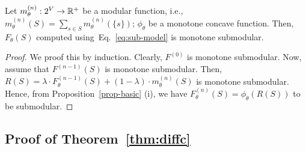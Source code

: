 \documentclass{article}
\begin{document}
\begin{proposition} 
Let  $m^{(n)} _{\theta} : 2^V \to \mathbb{R}^+ $ be a modular function, i.e.,  $m^{(n)}  _{\theta} (S) = \sum_{s\in S}m^{(n)} _{\theta}(\{s\})$;   $\phi_{\theta}$ be a monotone concave function. Then, $F_{\theta}(S)$ computed using~Eq.~\eqref{eq:sub-model} is  monotone submodular.
\end{proposition}

\begin{proof}
 We proof this by induction. Clearly,  $F^{(0)}$ is monotone submodular. Now, assume that $F^{(n-1)}(S)$ is monotone submodular.
 Then,  $R(S) = \lambda \cdot F^{(n-1)} _{\theta}(S)  + (1-\lambda)\cdot m_{\theta} ^{(n)} (S)$ is monotone submodular. Hence, from Proposition~\ref{prop-basic} (i), we have $F^{(n)} _{\theta}(S) = \phi_{\theta} (R(S))$ to be submodular.
\end{proof}
%
\subsection{Proof of Theorem~\ref{thm:diffc}}
\end{document}
